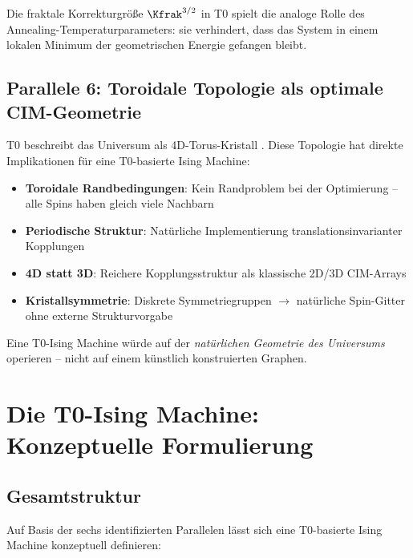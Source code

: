 Die fraktale Korrekturgröße $\Kfrak^{3/2}$ in T0 spielt die analoge Rolle des 
Annealing-Temperaturparameters: sie verhindert, dass das System in einem lokalen 
Minimum der geometrischen Energie gefangen bleibt.

\subsection{Parallele 6: Toroidale Topologie als optimale CIM-Geometrie}

T0 beschreibt das Universum als 4D-Torus-Kristall \cite{pascher_torus_2025}. 
Diese Topologie hat direkte Implikationen für eine T0-basierte Ising Machine:

\begin{itemize}
    \item \textbf{Toroidale Randbedingungen}: Kein Randproblem bei der Optimierung -- 
    alle Spins haben gleich viele Nachbarn
    \item \textbf{Periodische Struktur}: Natürliche Implementierung 
    translationsinvarianter Kopplungen
    \item \textbf{4D statt 3D}: Reichere Kopplungsstruktur als klassische 2D/3D 
    CIM-Arrays
    \item \textbf{Kristallsymmetrie}: Diskrete Symmetriegruppen $\rightarrow$ 
    natürliche Spin-Gitter ohne externe Strukturvorgabe
\end{itemize}

\begin{keyresult}[Parallele 6]
    Eine T0-Ising Machine würde auf der \emph{natürlichen Geometrie des Universums} 
    operieren -- nicht auf einem künstlich konstruierten Graphen.
\end{keyresult}

\clearpage

\section{Die T0-Ising Machine: Konzeptuelle Formulierung}
\label{sec:t0machine}

\subsection{Gesamtstruktur}

Auf Basis der sechs identifizierten Parallelen lässt sich eine T0-basierte 
Ising Machine konzeptuell definieren:

